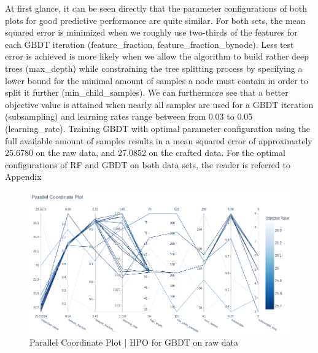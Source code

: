 At first glance, it can be seen directly that the parameter configurations of both plots for good predictive performance are quite similar. For both sets, the mean squared error is minimized when we roughly use two-thirds of the features for each GBDT iteration (feature\_fraction, feature\_fraction\_bynode). Less test error is achieved is more likely when we allow the algorithm to build rather deep trees (max\_depth) while constraining the tree splitting process by specifying a lower bound for the minimal amount of samples a node must contain in order to split it further (min\_child\_samples). We can furthermore see that a better objective value is attained when nearly all samples are used for a GBDT iteration (subsampling) and learning rates range between from 0.03 to 0.05 (learning\_rate).
Training GBDT with optimal parameter configuration using the full available amount of samples results in a mean squared error of approximately 25.6780 on the raw data, and 27.0852 on the crafted data.
For the optimal configurations of RF and GBDT on both data sets, the reader is referred to Appendix 

\begin{figure}[h]
	\centering
	\includegraphics[width=\linewidth]
	{figures/HPO/GBDT_HPO_Raw_ParallelPlot.png}
	\caption{Parallel Coordinate Plot | HPO for GBDT on raw data}
	\label{fig:GBDT_HPO_Raw_ParallelPlot}
\end{figure}

